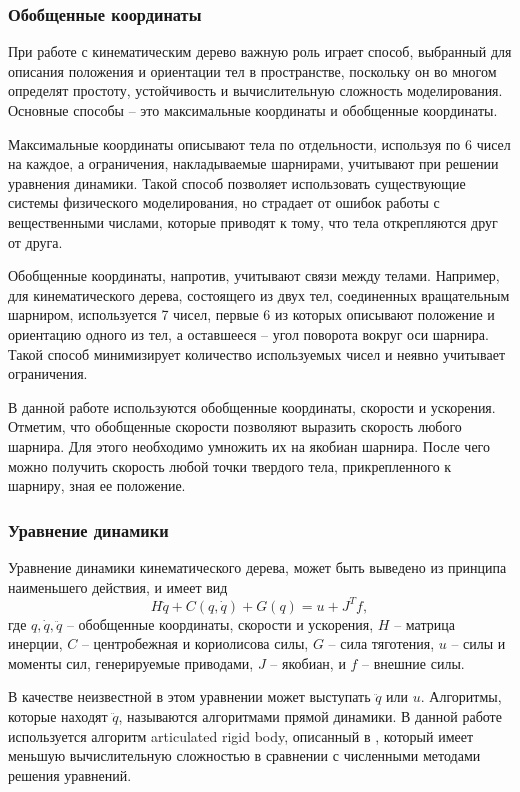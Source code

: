 \subsubsection{Обобщенные координаты}

При работе с кинематическим дерево важную роль играет способ, выбранный для описания положения и ориентации тел в пространстве, поскольку он во многом определят простоту, устойчивость и вычислительную сложность моделирования. Основные способы -- это максимальные координаты и обобщенные координаты.

Максимальные координаты описывают тела по отдельности, используя по 6 чисел на каждое, а ограничения, накладываемые шарнирами, учитывают при решении уравнения динамики. Такой способ позволяет использовать существующие системы физического моделирования, но страдает от ошибок работы с вещественными числами, которые приводят к тому, что тела открепляются друг от друга.

Обобщенные координаты, напротив, учитывают связи между телами. Например, для кинематического дерева, состоящего из двух тел, соединенных вращательным шарниром, используется 7 чисел, первые 6 из которых описывают положение и ориентацию одного из тел, а оставшееся -- угол поворота вокруг оси шарнира. Такой способ минимизирует количество используемых чисел и неявно учитывает ограничения.

В данной работе используются обобщенные координаты, скорости и ускорения. Отметим, что обобщенные скорости позволяют выразить скорость любого шарнира. Для этого необходимо умножить их на якобиан шарнира. После чего можно получить скорость любой точки твердого тела, прикрепленного к шарниру, зная ее положение.

\subsubsection{Уравнение динамики}

Уравнение динамики кинематического дерева, может быть выведено из принципа наименьшего действия, и имеет вид
\begin{equation*}
  H \ddot{q} + C(q, \dot{q}) + G(q) = u + J^{T} f, \tag{1.1}\label{eq:1.1}
\end{equation*}
где $q, \dot{q}, \ddot{q}$ -- обобщенные координаты, скорости и ускорения, $H$ -- матрица инерции, $C$ -- центробежная и кориолисова силы, $G$ -- сила тяготения, $u$ -- силы и моменты сил, генерируемые приводами, $J$ -- якобиан, и $f$ -- внешние силы.

В качестве неизвестной в этом уравнении может выступать $\ddot{q}$ или $u$. Алгоритмы, которые находят $\ddot{q}$, называются алгоритмами прямой динамики. В данной работе используется алгоритм articulated rigid body, описанный в \cite{Featherstone}, который имеет меньшую вычислительную сложностью в сравнении с численными методами решения уравнений.

